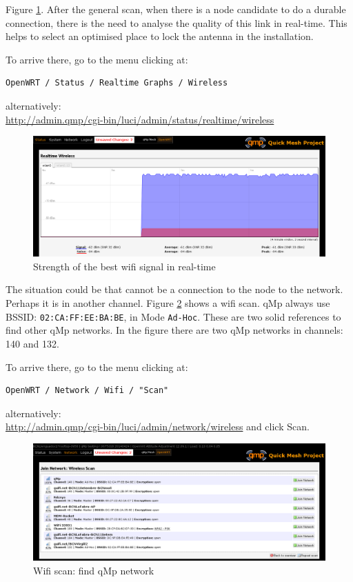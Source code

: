 \documentclass[11pt]{article}
\begin{document}
Figure \ref{fig:wifi-signal-rt}. After the general scan, when there is a
node candidate to do a durable connection, there is the need to
analyse the quality of this link in real-time. This helps to select an
optimised place to lock the antenna in the installation.

\noindent
To arrive there, go to the menu clicking at:
\begin{verbatim}
OpenWRT / Status / Realtime Graphs / Wireless
\end{verbatim}
alternatively:\\
\url{http://admin.qmp/cgi-bin/luci/admin/status/realtime/wireless}

\begin{figure}[htb]
\centering
\includegraphics[width=.9\linewidth]{./img/qMp-basics-scrot/realtime_wifi_link.png}
\caption{\label{fig:wifi-signal-rt}Strength of the best wifi signal in real-time}
\end{figure}

The situation could be that cannot be a connection to the node to the
network. Perhaps it is in another channel. Figure \ref{fig:find-qmp} shows a
wifi scan. qMp always use BSSID: \texttt{02:CA:FF:EE:BA:BE}, in Mode
\texttt{Ad-Hoc}. These are two solid references to find other qMp networks. In
the figure there are two qMp networks in channels: 140 and 132.

\noindent
To arrive there, go to the menu clicking at:
\begin{verbatim}
OpenWRT / Network / Wifi / "Scan"
\end{verbatim}
alternatively:\\
\url{http://admin.qmp/cgi-bin/luci/admin/network/wireless}
and click Scan.

\begin{figure}[htb]
\centering
\includegraphics[width=.9\linewidth]{./img/qMp-basics-scrot/wifi_scan_find_qmp.png}
\caption{\label{fig:find-qmp}Wifi scan: find qMp network}
\end{figure}
\end{document}
